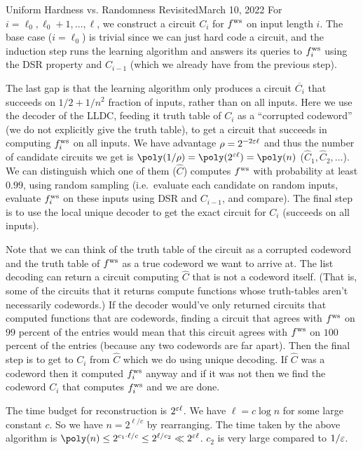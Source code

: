 \begin{lecture}{8}{Uniform Hardness vs. Randomness Revisited}{March 10, 2022}
For $i=\ell_0,\ell_0+1,\ldots,\ell$, we construct a circuit $C_i$ for $ f^{\text{ws}} $ on input length $i$. The base case ($i=\ell_0$) is trivial since we can just hard code a circuit, and the induction step runs the learning algorithm and answers its queries to $ f^{\text{ws}} _i$ using the DSR property and $C_{i-1}$ (which we already have from the previous step). 

The last gap is that the learning algorithm only produces a circuit $\overline{C_i}$ that succeeds on $1/2+1/n^2$ fraction of inputs, rather than on all inputs. Here we use the decoder of the LLDC, feeding it truth table of $C_i$ as a ``corrupted codeword'' (we do not explicitly give the truth table), to get a circuit that succeeds in computing $ f^{\text{ws}} _i$ on all inputs. We have advantage $\rho = 2^{-2\varepsilon \ell}$ and thus the number of candidate circuits we get is $\poly(1/\rho) = \poly(2^{\eps \ell}) = \poly(n)$ ($\hat{C}_1,\hat{C}_2,\ldots$).
We can distinguish which one of them ($\hat{C}$) computes $ f^{\text{ws}} $ with probability at least $0.99$, using random sampling (i.e.\, evaluate each candidate on random inputs, evaluate $ f^{\text{ws}} _i$ on these inputs using DSR and $C_{i-1}$, and compare). The final step is to use the local unique decoder to get the exact circuit for $C_i$ (succeeds on all inputs). 

Note that we can think of the truth table of the circuit as a corrupted codeword and the truth table of $ f^{\text{ws}} $ as a true codeword we want to arrive at. The list decoding can return a circuit computing $\hat{C}$ that is not a codeword itself. (That is, some of the circuits that it returns compute functions whose truth-tables aren't necessarily codewords.) If the decoder would've only returned circuits that computed functions that are codewords, finding a circuit that agrees with $ f^{\text{ws}} $ on $99$ percent of the entries would mean that this circuit agrees with $ f^{\text{ws}} $ on $100$ percent of the entries (because any two codewords are far apart). 
Then the final step is to get to $C_i$ from $\hat{C}$ which we do using unique decoding. If $\hat{C}$ was a codeword then it computed $ f^{\text{ws}} _i$ anyway and if it was not then we find the codeword $C_i$ that computes $ f^{\text{ws}} _i$ and we are done.

The time budget for reconstruction is $2^{\varepsilon \ell}$. We have $\ell=c \log n$ for some large constant $c$. So we have $n= 2^{\ell/c}$ by rearranging. The time taken by the above algorithm is $\poly(n) \leq 2^{c_1 \cdot \ell/c} \leq 2^{\ell/c_2} \ll 2^{\eps \ell}$. $c_2$ is very large compared to $1/\varepsilon$. 


\end{lecture}
